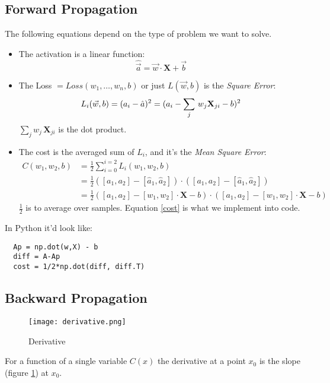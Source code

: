 \subsection{Forward Propagation}
The following equations depend on the type of problem we want to solve.
\begin{itemize}
  \item The activation is a linear function:
    \[ \hat{\vec{a}} = \vec{w}\cdot\mathbf{X} + \vec{b}\]
  \item The Loss $= Loss(w_1,\ldots, w_n, b)$ or just $L(\vec{w},b)$ is the \textit{Square Error}:
  \[
  L_i(\vec{w}, b) = (a_i - \hat{a})^2\\
  =(a_i -\sum_j\,w_j\mathbf{X}_{ji} -b)^2
\]
$\sum_j w_j\,\mathbf{X}_{ji}$ is the dot product.

\item The cost is the averaged sum of $L_i$, and it's the \textit{Mean Square Error}:
\begin{align}
  C(w_1, w_2, b) &= \frac{1}{2} \sum_{i=0}^{i=2} L_i(w_1, w_2, b)\nonumber\\
  &= \frac{1}{2}([a_1, a_2] - [\hat{a}_1, \hat{a}_2])\cdot{}([a_1, a_2]-[\hat{a}_1, \hat{a}_2])\nonumber\\
  &=\frac{1}{2}([a_1, a_2] - [w_1, w_2]\cdot{}\mathbf{X}-b)\cdot{}([a_1, a_2] - [w_1,w_2]\cdot{}\mathbf{X} -b) \label{cost}
\end{align}
$\frac{1}{2}$ is to average over samples. Equation \ref{cost} is what we implement into code.
\end{itemize}
In Python it'd look like:
\begin{center}
  \begin{BVerbatim}
  Ap = np.dot(w,X) - b
  diff = A-Ap 
  cost = 1/2*np.dot(diff, diff.T)
  \end{BVerbatim}
\end{center}





\subsection{Backward Propagation}
\begin{figure}
  \centering
  \texttt{[image: derivative.png]}
  \caption{Derivative}\label{fig:basics}
\end{figure}

For a function of a single variable $C(x)$ the derivative at a point $x_0$ is the slope (figure \ref{fig:basics}) at $x_0$.

